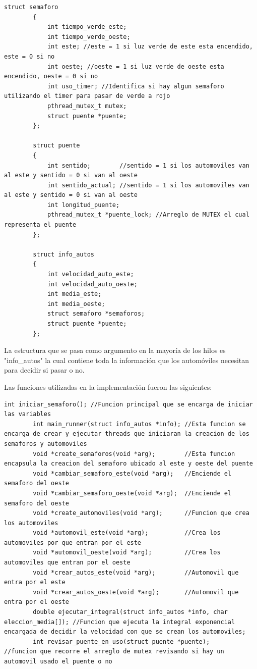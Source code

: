 \documentclass[16pt,a4papper]{article}
\begin{document}
	\begin{lstlisting}[style=CStyle]
		struct semaforo
		{
			int tiempo_verde_este;
			int tiempo_verde_oeste;
			int este; //este = 1 si luz verde de este esta encendido, este = 0 si no 
			int oeste; //oeste = 1 si luz verde de oeste esta encendido, oeste = 0 si no
			int uso_timer; //Identifica si hay algun semaforo utilizando el timer para pasar de verde a rojo
			pthread_mutex_t mutex; 
			struct puente *puente; 
		};
		
		struct puente
		{
			int sentido;        //sentido = 1 si los automoviles van al este y sentido = 0 si van al oeste
			int sentido_actual; //sentido = 1 si los automoviles van al este y sentido = 0 si van al oeste
			int longitud_puente;
			pthread_mutex_t *puente_lock; //Arreglo de MUTEX el cual representa el puente
		};
		
		struct info_autos 
		{
			int velocidad_auto_este;
			int velocidad_auto_oeste;
			int media_este;
			int media_oeste;
			struct semaforo *semaforos;
			struct puente *puente;
		};
	\end{lstlisting}
	
	La estructura que se pasa como argumento en la mayoría de los hilos es "info\_autos" la cual contiene toda la información que los automóviles necesitan para decidir si pasar o no.
	
	Las funciones utilizadas en la implementación fueron las siguientes:
	
	\begin{lstlisting}[style=CStyle]
		int iniciar_semaforo(); //Funcion principal que se encarga de iniciar las variables
		int main_runner(struct info_autos *info); //Esta funcion se encarga de crear y ejecutar threads que iniciaran la creacion de los semaforos y automoviles
		void *create_semaforos(void *arg);        //Esta funcion encapsula la creacion del semaforo ubicado al este y oeste del puente
		void *cambiar_semaforo_este(void *arg);   //Enciende el semaforo del oeste
		void *cambiar_semaforo_oeste(void *arg);  //Enciende el semaforo del oeste
		void *create_automoviles(void *arg);      //Funcion que crea los automoviles
		void *automovil_este(void *arg);          //Crea los automoviles por que entran por el este
		void *automovil_oeste(void *arg);         //Crea los automoviles que entran por el oeste
		void *crear_autos_este(void *arg);		  //Automovil que entra por el este	
		void *crear_autos_oeste(void *arg);       //Automovil que entra por el oeste
		double ejecutar_integral(struct info_autos *info, char eleccion_media[]); //Funcion que ejecuta la integral exponencial encargada de decidir la velocidad con que se crean los automoviles;
		int revisar_puente_en_uso(struct puente *puente);                         //funcion que recorre el arreglo de mutex revisando si hay un automovil usado el puente o no
	\end{lstlisting}
\end{document}
